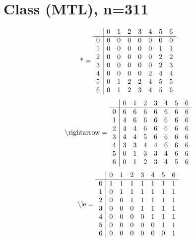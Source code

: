 \documentclass[11pt]{article}
\begin{document}
\section{Class (MTL), n=311}
\[\text{*} = 
\begin{array}{r | r r r r r r r}
 & 0 & 1 & 2 & 3 & 4 & 5 & 6 \\ \hline
0 & 0 & 0 & 0 & 0 & 0 & 0 & 0 \\
1 & 0 & 0 & 0 & 0 & 0 & 1 & 1 \\
2 & 0 & 0 & 0 & 0 & 0 & 2 & 2 \\
3 & 0 & 0 & 0 & 0 & 0 & 2 & 3 \\
4 & 0 & 0 & 0 & 0 & 2 & 4 & 4 \\
5 & 0 & 1 & 2 & 2 & 4 & 5 & 5 \\
6 & 0 & 1 & 2 & 3 & 4 & 5 & 6 \\
\end{array}
\]
\[\text{\textbackslash rightarrow} = 
\begin{array}{r | r r r r r r r}
 & 0 & 1 & 2 & 3 & 4 & 5 & 6 \\ \hline
0 & 6 & 6 & 6 & 6 & 6 & 6 & 6 \\
1 & 4 & 6 & 6 & 6 & 6 & 6 & 6 \\
2 & 4 & 4 & 6 & 6 & 6 & 6 & 6 \\
3 & 4 & 4 & 5 & 6 & 6 & 6 & 6 \\
4 & 3 & 3 & 4 & 4 & 6 & 6 & 6 \\
5 & 0 & 1 & 3 & 3 & 4 & 6 & 6 \\
6 & 0 & 1 & 2 & 3 & 4 & 5 & 6 \\
\end{array}
\]
\[\text{\textbackslash le} = 
\begin{array}{r | r r r r r r r}
 & 0 & 1 & 2 & 3 & 4 & 5 & 6 \\ \hline
0 & 1 & 1 & 1 & 1 & 1 & 1 & 1 \\
1 & 0 & 1 & 1 & 1 & 1 & 1 & 1 \\
2 & 0 & 0 & 1 & 1 & 1 & 1 & 1 \\
3 & 0 & 0 & 0 & 1 & 1 & 1 & 1 \\
4 & 0 & 0 & 0 & 0 & 1 & 1 & 1 \\
5 & 0 & 0 & 0 & 0 & 0 & 1 & 1 \\
6 & 0 & 0 & 0 & 0 & 0 & 0 & 1 \\
\end{array}
\]
\end{document}
